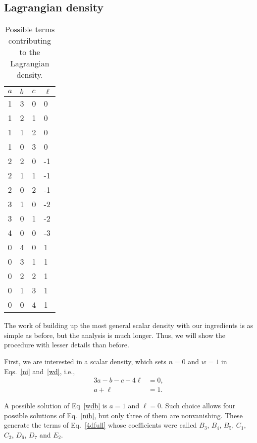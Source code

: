 \subsection{\label{sec:ld}Lagrangian density}

\begin{table}
  \caption{Possible terms contributing to the Lagrangian density.}
  \label{tab:ld}
  \begin{tabular}{|C{.23\linewidth}C{.23\linewidth}C{.23\linewidth}C{.23\linewidth}|}
    \hline
    $a$ & $b$ & $c$ & $\ell$ \\
     & 3 & 0 & 0\\
    1 & 2 & 1 & 0\\
    1 & 1 & 2 & 0\\
    1 & 0 & 3 & 0\\
    2 & 2 & 0 & -1\\
    2 & 1 & 1 & -1\\
    2 & 0 & 2 & -1\\
    3 & 1 & 0 & -2\\
    3 & 0 & 1 & -2\\
    4 & 0 & 0 & -3\\
    0 & 4 & 0 & 1\\
    0 & 3 & 1 & 1\\
    0 & 2 & 2 & 1\\
    0 & 1 & 3 & 1\\
    0 & 0 & 4 & 1\\
    \hline
  \end{tabular}
\end{table}

The work of building up the most general scalar density with our ingredients is as simple as before, but the analysis is much longer. Thus, we will show the procedure with lesser details than before.

First, we are interested in a scalar density, which sets $n = 0$ and $w = 1$ in Eqs.~\eqref{ni} and~\eqref{wd}, i.e.,
\begin{align}
  3a -b -c  + 4\ell &= 0, \label{nib}\\
  a + \ell &= 1. \label{wdb}
\end{align}

A possible solution of Eq~\eqref{wdb} is $a=1$ and $\ell = 0$. Such choice allows four possible solutions of Eq.~\eqref{nib}, but only three of them are nonvanishing. These generate the terms of Eq.~\eqref{4dfull} whose coefficients were called $B_3$, $B_4$, $B_5$, $C_1$, $C_2$, $D_6$, $D_7$ and $E_2$.

